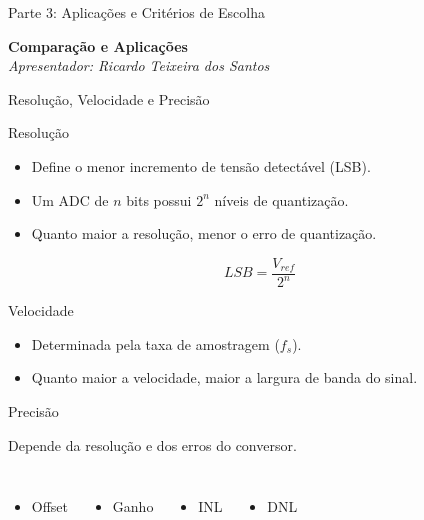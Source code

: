 \documentclass{beamer}
\begin{document}
\begin{frame}{Parte 3: Aplicações e Critérios de Escolha}
    \begin{center}
        \Large{\textbf{Comparação e Aplicações}} \\
        \vspace{0.5cm}
        \textit{Apresentador: Ricardo Teixeira dos Santos}
    \end{center}
\end{frame}

\begin{frame}{Resolução, Velocidade e Precisão}
	
	\begin{block}{Resolução}
		\begin{itemize}
			\item Define o menor incremento de tensão detectável (LSB).
			\item Um ADC de $n$ bits possui $2^n$ níveis de quantização.
			\item Quanto maior a resolução, menor o erro de quantização.
		\end{itemize}
		\[
		LSB=\frac{V_{ref}}{2^n}
		\]
	\end{block}
	
	\begin{block}{Velocidade}
		\small
		\begin{itemize}
			\item Determinada pela taxa de amostragem ($f_s$).
			\item Quanto maior a velocidade, maior a largura de banda do sinal.
		\end{itemize}
	\end{block}
	
	\begin{block}{Precisão}
		\small
		
		Depende da resolução e dos erros do conversor.
		
		\begin{columns}[T]
			\begin{itemize}
				\item Offset
			\end{itemize}
			\begin{itemize}
				\item Ganho
			\end{itemize}
			\begin{itemize}
				\item INL
			\end{itemize}
			\begin{itemize}
				\item DNL
			\end{itemize}
		\end{columns}
		
	\end{block}
\end{frame}
\end{document}
